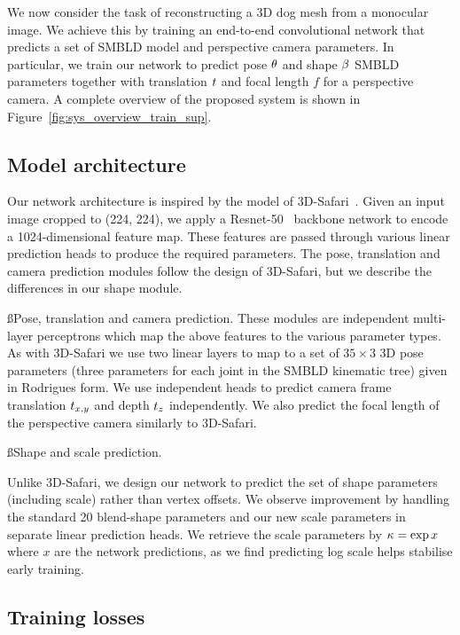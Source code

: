 We now consider the task of reconstructing a 3D dog mesh from a monocular image. We achieve this by training an end-to-end convolutional network that predicts a set of SMBLD model and perspective camera parameters. In particular, we train our network to predict pose $\theta$ and shape $\beta$ SMBLD parameters together with translation $t$ and focal length $f$ for a perspective camera. A complete overview of the proposed system is shown in Figure~\ref{fig:sys_overview_train_sup}.

\subsection{Model architecture}

Our network architecture is inspired by the model of 3D-Safari~\cite{Zuffi19Safari}. Given an input image cropped to (224, 224), we apply a Resnet-50~\cite{he2016deep} backbone network to encode a 1024-dimensional feature map. These features are passed through various linear prediction heads to produce the required parameters. The pose, translation and camera prediction modules follow the design of 3D-Safari, but we describe the differences in our shape module.

\ss{Pose, translation and camera prediction.}
These modules are independent multi-layer perceptrons which map the above features to the various parameter types. As with 3D-Safari we use two linear layers to map to a set of $35 \times 3$ 3D pose parameters (three parameters for each joint in the SMBLD kinematic tree) given in Rodrigues form. We use independent heads to predict camera frame translation $t_{x,y}$ and depth $t_{z}$ independently. We also predict the focal length of the perspective camera similarly to 3D-Safari.

\ss{Shape and scale prediction.}

Unlike 3D-Safari, we design our network to predict the set of shape parameters (including scale) rather than vertex offsets. We observe improvement by handling the standard 20 blend-shape parameters and our new scale parameters in separate linear prediction heads. We retrieve the scale parameters by $\kappa = \exp{x}$ where $x$ are the network predictions, as we find predicting log scale helps stabilise early training.

\subsection{Training losses}

